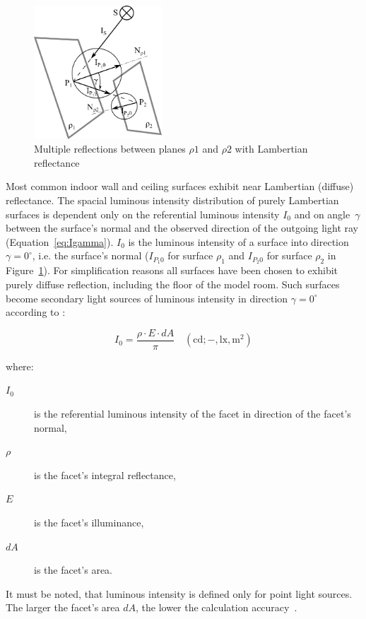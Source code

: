 \begin{figure}[htb]
  \centering
  \includegraphics[width=136pt]{diffuseReflection}
  \caption{Multiple reflections between planes $\rho1$ and $\rho2$ with Lambertian reflectance}
  \label{fig:difRefl}
\end{figure}

Most common indoor wall and ceiling surfaces exhibit near Lambertian (diffuse) reflectance. The spacial luminous intensity distribution of purely Lambertian surfaces is dependent only on the referential luminous intensity $I_{0}$ and on angle~$\gamma$ between the surface's normal and the observed direction of the outgoing light ray (Equation~\ref{eq:Igamma}). $I_{0}$ is the luminous intensity of a surface into direction $\gamma=0^{\circ}$, i.e. the surface's normal ($I_{P_{1}0}$ for surface $\rho_1$ and $I_{P_{2}0}$ for surface $\rho_2$ in Figure~\ref{fig:difRefl}). For simplification reasons all surfaces have been chosen to exhibit purely diffuse reflection, including the floor of the model room. Such surfaces become secondary light sources of luminous intensity in direction $\gamma=0^{\circ}$ according to \cite{Habel}:

\begin{equation}
I_{0}=\frac{\rho \cdot E \cdot dA}{\pi} \quad \mathrm{(cd;-,lx,m^{2})}
\label{eq:lumInt}
\end{equation}

where:
\begin{description}
	\item[$I_{0}$] is the referential luminous intensity of the facet in direction of the facet's normal,
	\item[$\rho$] is the facet's integral reflectance,
	\item[$E$] is the facet's illuminance,
	\item[$dA$] is the facet's area.
\end{description}

It must be noted, that luminous intensity is defined only for point light sources. The larger the facet's area $dA$, the lower the calculation accuracy~\cite{handbook}.

